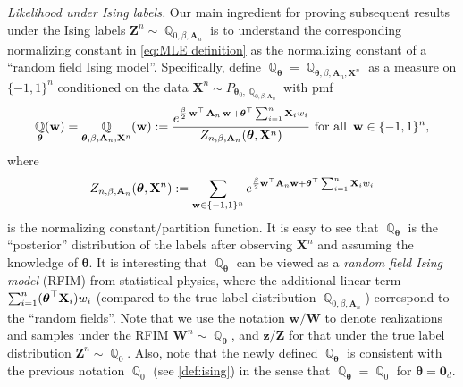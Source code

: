 \documentclass[preprint,reqno]{imsart}
\newcommand{\ttheta}{\boldsymbol{\theta}}
\DeclareMathOperator{\bw}{\textbf{w}}
\DeclareMathOperator{\QQ}{\mathbb{Q}}
\newcommand{\A}{\mathbf{A}}
\newcommand{\W}{\mathbf{W}}
\newcommand{\Z}{\mathbf{Z}}
\newcommand{\X}{\mathbf{X}}
\DeclareMathOperator{\sumin}{\sum_{\mathnormal i=1}^{\mathnormal n}}
\begin{document}
%
\vspace{2mm}
\noindent \emph{Likelihood under Ising labels.} Our main ingredient for proving subsequent results under the Ising labels $\mathbf{Z}^n\sim  \QQ_{0, \beta, \A_n}$ is to understand the corresponding normalizing constant in \eqref{eq:MLE definition} as the normalizing constant of a ``random field Ising model''. Specifically, define $\QQ_{\ttheta} = \QQ_{\ttheta,\beta, \A_n,\X^n}$ as a measure on $\{-1, 1\}^n$ conditioned on the data $\X^n \sim P_{\ttheta_0, \QQ_{0,\beta,\A_n}}$ with pmf
\begin{equation}\label{eq:rfim def}
    \QQ_{\ttheta} (\bw) = \QQ_{\ttheta,\beta, \A_n,\X^n}(\bw) := \frac{e^{\frac{\beta}{2} \bw^\top \A_n \bw + \ttheta^\top \sumin \X_i w_i }}{Z_{n,\beta,\A_n}(\ttheta, \X^n)} ~ \text{for all} ~ \bw \in \{-1,1\}^n,
\end{equation}
where $$Z_{n,\beta,\A_n}(\ttheta, \X^n) := \sum_{\mathbf{w} \in \{-1,1\}^n} e^{\frac{\beta}{2} \mathbf{w}^{\top} \A_n \mathbf{w} + \ttheta^\top \sumin \X_i w_i}$$ is the normalizing constant/partition function. It is easy to see that $\QQ_{\ttheta}$ is the ``posterior'' distribution of the labels after observing $\X^n$ and assuming the knowledge of $\ttheta$. 
It is interesting that $\QQ_{\ttheta}$ can be viewed as a \emph{random field Ising model} (RFIM) from statistical physics, where the additional linear term $\sumin (\ttheta^\top \X_i) w_i$ (compared to the true label distribution $\QQ_{0,\beta,\A_n}$) correspond to the ``random fields''.
%
Note that we use the notation $\mathbf{w}/\W$ to denote realizations and samples under the RFIM $\W^n \sim \QQ_{\ttheta}$, and $\mathbf{z}/\Z$ for that under the true label distribution $\Z^n \sim \QQ_0$.
Also, note that the newly defined $\QQ_{\ttheta}$ is consistent with the previous notation $\QQ_0$ (see \cref{def:ising}) in the sense that $\QQ_{\ttheta} = \QQ_0$ for $\ttheta =\mathbf{0}_d$.
\end{document}

